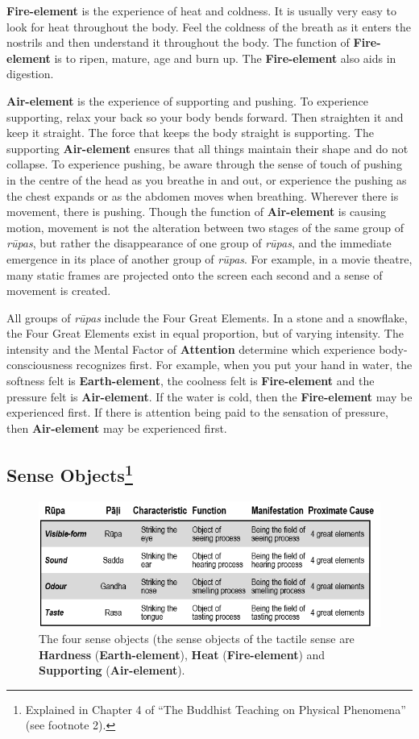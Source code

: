 \textbf{Fire-element} is the experience of heat and coldness. It is usually very easy to look for heat throughout the body. Feel the coldness of the breath as it enters the nostrils and then understand it throughout the body. The function of \textbf{Fire-element} is to ripen, mature, age and burn up. The \textbf{Fire-element} also aids in digestion.

\textbf{Air-element} is the experience of supporting and pushing. To experience supporting, relax your back so your body bends forward. Then straighten it and keep it straight. The force that keeps the body straight is supporting. The supporting \textbf{Air-element} ensures that all things maintain their shape and do not collapse. To experience pushing, be aware through the sense of touch of pushing in the centre of the head as you breathe in and out, or experience the pushing as the chest expands or as the abdomen moves when breathing. Wherever there is movement, there is pushing. Though the function of \textbf{Air-element} is causing motion, movement is not the alteration between two stages of the same group of \textit{rūpas}, but rather the disappearance of one group of \textit{rūpas}, and the immediate emergence in its place of another group of \textit{rūpas}. For example, in a movie theatre, many static frames are projected onto the screen each second and a sense of movement is created.

All groups of \textit{rūpas} include the Four Great Elements. In a stone and a snowflake, the Four Great Elements exist in equal proportion, but of varying intensity. The intensity and the Mental Factor of \textbf{Attention} determine which experience body-consciousness recognizes first. For example, when you put your hand in water, the softness felt is \textbf{Earth-element}, the coolness felt is \textbf{Fire-element} and the pressure felt is \textbf{Air-element}. If the water is cold, then the \textbf{Fire-element} may be experienced first. If there is attention being paid to the sensation of pressure, then \textbf{Air-element} may be experienced first.

\subsection*{Sense Objects\footnote{Explained in Chapter 4 of “The Buddhist Teaching on Physical Phenomena” (see footnote 2).}}

\begin{figure} [h]
\centering
\includegraphics[width=0.8\linewidth]{./Diagrams/Objects}
\caption{The four sense objects (the sense objects of the tactile sense are \textbf{Hardness} (\textbf{Earth-element}), \textbf{Heat} (\textbf{Fire-element}) and \textbf{Supporting} (\textbf{Air-element}).}
\label{fig:Objects}
\end{figure}

